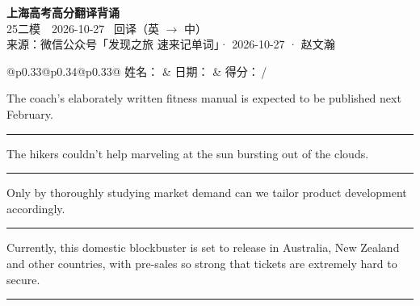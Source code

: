 \documentclass[11pt,a4paper]{article}
\newcommand{\num}[1]{\makebox[1.9em][r]{#1.}\hspace{0.3em}}
\newcommand{\wline}{\noindent\rule{\linewidth}{0.4pt}}
\begin{document}
\pagestyle{plain}
\begin{center}
{\LARGE\bfseries 上海高考高分翻译背诵 }\\[0.25em]
{\large 25二模　2026-10-27 \quad\ 回译（英 $\to$ 中）}\\[0.35em]
{\footnotesize 来源：微信公众号「发现之旅 速来记单词」· 2026-10-27 · 赵文瀚}
\end{center}

\vspace{0.4em}
\noindent\begin{tabular}{@{}p{0.33\textwidth}@{}p{0.34\textwidth}@{}p{0.33\textwidth}@{}}
姓名：\underline{\hspace{2.0cm}} & 日期：\underline{\hspace{2.0cm}} & 得分：\underline{\hspace{1.4cm}}\,/ \\
\end{tabular}

\vspace{0.5em}

\vspace{0.8em}
\num{1}The coach’s elaborately written fitness manual is expected to be published next February.

\vspace{0.25em}

\wline

\num{2}The hikers couldn’t help marveling at the sun bursting out of the clouds.

\vspace{0.25em}

\wline

\num{3}Only by thoroughly studying market demand can we tailor product development accordingly.

\vspace{0.25em}

\wline

\num{4}Currently, this domestic blockbuster is set to release in Australia, New Zealand and other countries, with pre-sales so strong that tickets are extremely hard to secure.

\vspace{0.25em}

\wline
\end{document}
